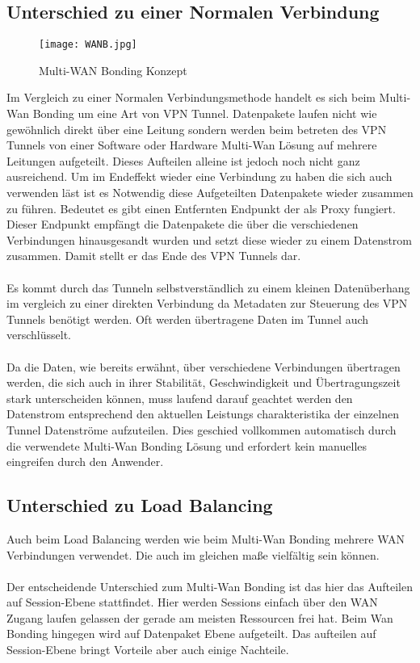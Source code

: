 \subsection{Unterschied zu einer Normalen Verbindung}
\begin{figure}[h]
    \centering
    \texttt{[image: WANB.jpg]}
    \caption[WANB]{Multi-WAN Bonding Konzept}%
\end{figure}
Im Vergleich zu einer Normalen Verbindungsmethode handelt es sich beim Multi-Wan Bonding um eine Art von VPN Tunnel. Datenpakete laufen nicht wie gewöhnlich direkt über eine Leitung sondern werden beim betreten des VPN Tunnels von einer Software oder Hardware Multi-Wan Lösung auf mehrere Leitungen aufgeteilt. Dieses Aufteilen alleine ist jedoch noch nicht ganz ausreichend. Um im Endeffekt wieder eine Verbindung zu haben die sich auch verwenden läst ist es Notwendig diese Aufgeteilten Datenpakete wieder zusammen zu führen. Bedeutet es gibt einen Entfernten Endpunkt der als Proxy fungiert. Dieser Endpunkt empfängt die Datenpakete die über die verschiedenen Verbindungen hinausgesandt wurden und setzt diese wieder zu einem Datenstrom zusammen. Damit stellt er das Ende des VPN Tunnels dar. 
\\\\
Es kommt durch das Tunneln selbstverständlich zu einem kleinen Datenüberhang im vergleich zu einer direkten Verbindung da Metadaten zur Steuerung des VPN Tunnels benötigt werden. Oft werden übertragene Daten im Tunnel auch verschlüsselt.
\\\\
Da die Daten, wie bereits erwähnt, über verschiedene Verbindungen übertragen werden, die sich auch in ihrer Stabilität, Geschwindigkeit und Übertragungszeit stark unterscheiden können, muss laufend darauf geachtet werden den Datenstrom entsprechend den aktuellen Leistungs charakteristika der einzelnen Tunnel Datenströme aufzuteilen. Dies geschied vollkommen automatisch durch die verwendete Multi-Wan Bonding Lösung und erfordert kein manuelles eingreifen durch den Anwender.

\subsection{Unterschied zu Load Balancing}
Auch beim Load Balancing werden wie beim Multi-Wan Bonding mehrere WAN Verbindungen verwendet. Die auch im gleichen maße vielfältig sein können.
\\\\
Der entscheidende Unterschied zum Multi-Wan Bonding ist das hier das Aufteilen auf Session-Ebene stattfindet. Hier werden Sessions einfach über den WAN Zugang laufen gelassen der gerade am meisten Ressourcen frei hat. Beim Wan Bonding hingegen wird auf Datenpaket Ebene aufgeteilt. Das aufteilen auf Session-Ebene bringt Vorteile aber auch einige Nachteile.
